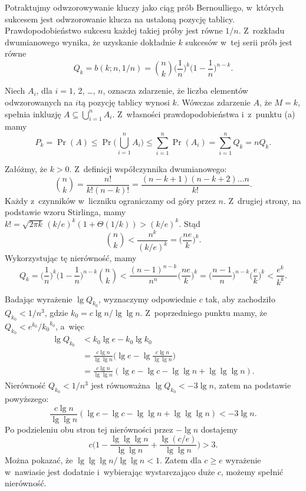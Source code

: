 
\subproblem %
Potraktujmy odwzorowywanie kluczy jako ciąg prób Bernoulliego, w~których sukcesem jest odwzorowanie klucza na ustaloną pozycję tablicy.
Prawdopodobieństwo sukcesu każdej takiej próby jest równe $1/n$.
Z~rozkładu dwumianowego wynika, że uzyskanie dokładnie $k$ sukcesów w~tej serii prób jest równe
\[
	Q_k = b(k;n,1/n) = \binom{n}{k}\biggl(\frac{1}{n}\biggr)^k\biggl(1-\frac{1}{n}\biggr)^{n-k}.
\]

\subproblem %
Niech $A_i$, dla $i=1$, 2, \dots, $n$, oznacza zdarzenie, że liczba elementów odwzorowanych na $i$\nbhyphen tą pozycję tablicy wynosi $k$.
Wówczas zdarzenie $A$, że $M=k$, spełnia inkluzję $A\subseteq\bigcup_{i=1}^nA_i$.
Z~własności prawdopodobieństwa i~z~punktu (a) mamy
\[
	P_k = \Pr(A) \le \Pr\biggl(\bigcup_{i=1}^nA_i\biggr) \le \sum_{i=1}^n\Pr(A_i) = \sum_{i=1}^nQ_k = nQ_k.
\]

\subproblem %
Załóżmy, że $k>0$.
Z~definicji współczynnika dwumianowego:
\[
	\binom{n}{k} = \frac{n!}{k!(n-k)!} = \frac{(n-k+1)(n-k+2)\dots n}{k!}.
\]
Każdy z~czynników w~liczniku ograniczamy od góry przez $n$.
Z~drugiej strony, na podstawie wzoru Stirlinga, mamy $k!=\sqrt{2\pi k}\,(k/e)^k(1+\Theta(1/k))>(k/e)^k$.
Stąd
\[
	\binom{n}{k} < \frac{n^k}{(k/e)^k} = \biggl(\frac{ne}{k}\biggr)^k.
\]
Wykorzystując tę nierówność, mamy
\[
	Q_k = \biggl(\frac{1}{n}\biggr)^k\biggl(1-\frac{1}{n}\biggr)^{n-k}\binom{n}{k} < \frac{(n-1)^{n-k}}{n^n}\biggl(\frac{ne}{k}\biggr)^k = \biggl(\frac{n-1}{n}\biggr)^{n-k}\biggl(\frac{e}{k}\biggr)^k < \frac{e^k}{k^k}.
\]

\subproblem %

\noindent Badając wyrażenie $\lg Q_{k_0}$, wyznaczymy odpowiednie $c$ tak, aby zachodziło $Q_{k_0}<1/n^3$, gdzie $k_0=c\lg n/\!\lg\lg n$.
Z~poprzedniego punktu mamy, że $Q_{k_0}<e^{k_0}\!/{k_0}^{k_0}$, a~więc
\begin{align*}
	\lg Q_{k_0} &< k_0\lg e-k_0\lg k_0 \\
	&= \frac{c\lg n}{\lg\lg n}\biggl(\lg e-\lg\frac{c\lg n}{\lg\lg n}\biggr) \\[1mm]
	&= \frac{c\lg n}{\lg\lg n}(\lg e-\lg c-\lg\lg n+\lg\lg\lg n).
\end{align*}
Nierówność $Q_{k_0}<1/n^3$ jest równoważna $\lg Q_{k_0}<-3\lg n$, zatem na podstawie powyższego:
\[
	\frac{c\lg n}{\lg\lg n}(\lg e-\lg c-\lg\lg n+\lg\lg\lg n) < -3\lg n.
\]
Po podzieleniu obu stron tej nierówności przez $-\lg n$ dostajemy
\[
	c\biggl(1-\frac{\lg\lg\lg n}{\lg\lg n}+\frac{\lg(c/e)}{\lg\lg n}\biggr) > 3.
\]
Można pokazać, że $\lg\lg\lg n/\lg\lg n<1$.
Zatem dla $c\ge e$ wyrażenie w~nawiasie jest dodatnie i~wybierając wystarczająco duże $c$, możemy spełnić nierówność.

